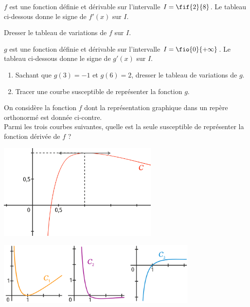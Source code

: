 \documentclass[a4paper,11pt,exos]{nsi} %
\begin{document}
\exo{}
$f$ est une fonction définie et dérivable sur l'intervalle $I=\fif{2}{8}$. Le tableau ci-dessous donne le signe de $f'(x)$ sur $I$.
\begin{center}
\end{center}
Dresser le tableau de variations de $f$ sur $I$.


\exo{}
$g$ est une fonction définie et dérivable sur l'intervalle $I=\fio{0}{+\infty}$. Le tableau ci-dessous donne le signe de $g'(x)$ sur $I$.
\begin{center}
\end{center}
\begin{enumerate}
	\item 	Sachant que $g(3)=-1$ et $g(6)=2$, dresser le tableau de variations de $g$.
	\item 	Tracer une courbe susceptible de représenter la fonction $g$.	
\end{enumerate}

\begin{minipage}{8cm}
	\exo{}
	On considère la fonction $f$ dont la représentation graphique dans un repère orthonormé est donnée ci-contre.\\

	Parmi les trois courbes suivantes, quelle est la seule susceptible de représenter la fonction dérivée de $f$ ?
\end{minipage}
\begin{minipage}{9cm}
	\begin{flushright}
		\includegraphics[width=8cm]{courbe3}
	\end{flushright}
\end{minipage}
\begin{center}
	\includegraphics[width=10cm]{courbe4}
\end{center}
\end{document}
